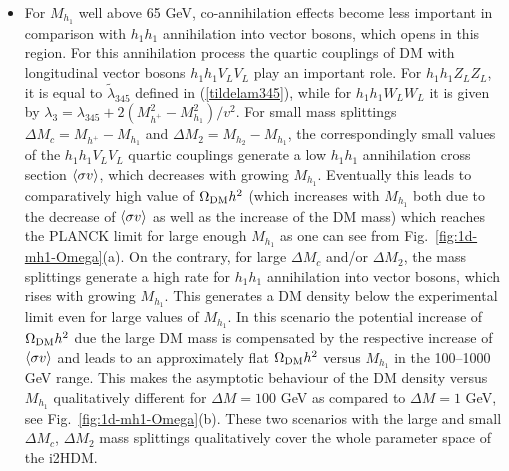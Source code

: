 \documentclass[12pt,a4paper]{article}
\begin{document}
\begin{itemize}
\item
For $M_{h_1}$ well above 65 GeV, co-annihilation effects become less important
in comparison with $h_1 h_1$ annihilation into vector bosons,
which opens in this region.
For this annihilation process the quartic couplings of DM with longitudinal vector bosons $h_1h_1 V_L V_L$ play an important role. 
For $h_1 h_1 Z_L Z_L$, it is equal to $\tilde\lambda_{345}$ defined in (\ref{tildelam345}), while for
$h_1 h_1 W_L W_L$ it is given by $\lambda_3 = \lambda_{345} + 2(M_{h^+}^2-M_{h_1}^2)/v^2$.
For small mass splittings $\Delta M_c = M_{h^+}-M_{h_1}$ and $\Delta M_2 = M_{h_2}-M_{h_1}$, 
the correspondingly small values of the $h_1h_1 V_L V_L$ quartic couplings 
generate a low $h_1 h_1$ annihilation cross section $\mathinner{\langle{\sigma v}\rangle}$, which decreases with growing $M_{h_1}$.
Eventually this leads to comparatively high value of $\Omega_{\rm DM} h^2$
(which increases with $M_{h_1}$ both
due to the decrease of $\mathinner{\langle{\sigma v}\rangle}$ as well as the increase of the DM mass)
which  reaches  the PLANCK limit for large enough $M_{h_1}$ 
as one can see from  Fig.~\ref{fig:1d-mh1-Omega}(a).
On the contrary, for large $\Delta M_c$ and/or $\Delta M_2$, the mass splittings generate
a high rate for $h_1 h_1$ annihilation into vector bosons, which rises with growing $M_{h_1}$. 
This generates a DM density below the experimental limit even for large values of $M_{h_1}$.
In this scenario the potential increase of  $\Omega_{\rm DM} h^2$ due the large DM mass
is compensated by the respective increase of  $\mathinner{\langle{\sigma v}\rangle}$
and leads to an approximately flat $\Omega_{\rm DM} h^2$ versus $M_{h_1}$
in the 100--1000 GeV  range.
This makes the asymptotic behaviour of the DM density versus $M_{h_1}$ qualitatively different for $\Delta M = 100$ GeV 
as compared to $\Delta M = 1$ GeV, see Fig.~\ref{fig:1d-mh1-Omega}(b).
These two scenarios with the large and small $\Delta M_c$, $\Delta M_2$ mass splittings 
qualitatively cover the whole parameter space of the i2HDM.
\end{itemize} 
\end{document}
